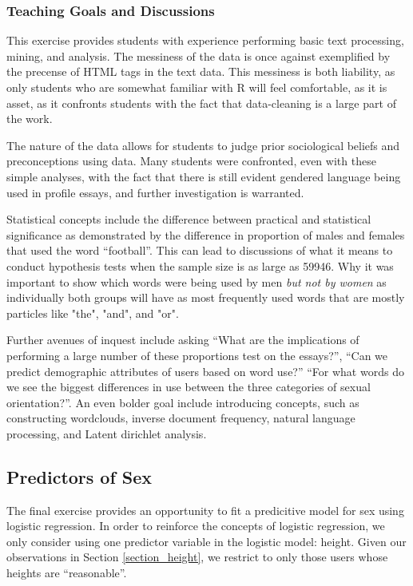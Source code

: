 \documentclass{article}\usepackage[]{graphicx}\usepackage[]{color}
\begin{document}
\subsubsection{Teaching Goals and Discussions}
This exercise provides students with experience performing basic text processing, mining, and analysis.  The messiness of the data is once against exemplified by the precense of HTML tags in the text data.  This messiness is both liability, as only students who are somewhat familiar with R will feel comfortable, as it is asset, as it confronts students with the fact that data-cleaning is a large part of the work.

The nature of the data allows for students to judge prior sociological beliefs and preconceptions using data.  Many students were confronted, even with these simple analyses, with the fact that there is still evident gendered language being used in profile essays, and further investigation is warranted.

Statistical concepts include the difference between practical and statistical significance as demonstrated by the difference in proportion of males and females that used the word ``football''.  This can lead to discussions of what it means to conduct hypothesis tests when the sample size is as large as 59946.  Why it was important to show which words were being used by men \textit{but not by women} as individually both groups will have as most frequently used words that are mostly particles like "the", "and", and "or".

Further avenues of inquest include asking ``What are the implications of performing a large number of these proportions test on the essays?'', ``Can we predict demographic attributes of users based on word use?''  ``For what words do we see the biggest differences in use between the three categories of sexual orientation?''.  An even bolder goal include introducing concepts, such as constructing wordclouds,  inverse document frequency, natural language processing, and Latent dirichlet analysis\cite{LDA:2003}.







\subsection{Predictors of Sex}
The final exercise provides an opportunity to fit a predicitive model for sex using logistic regression.  In order to reinforce the concepts of logistic regression, we only consider using one predictor variable in the logistic model: height.  Given our observations in Section \ref{section_height}, we restrict to only those users whose heights are ``reasonable''.
\end{document}
